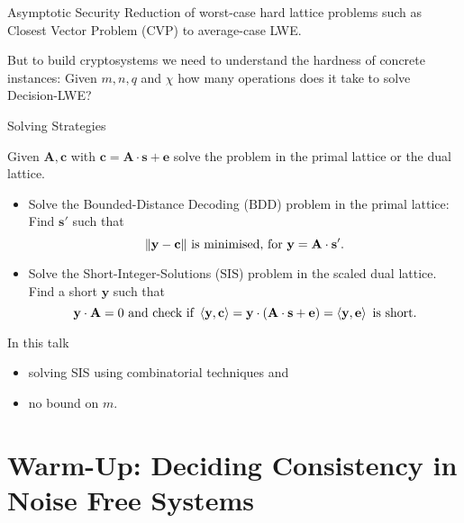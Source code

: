 \documentclass[10pt]{beamer}
\newcommand{\dotp}[2]{\ensuremath{\left\langle {#1},{#2}\right\rangle}\xspace}
\renewcommand{\vec}[1]{\mathbf{#1}\xspace}
\begin{document}
\begin{frame}{Asymptotic Security}
Reduction of worst-case hard lattice problems such as Closest Vector Problem (CVP) to average-case LWE.

\vspace{1em}\pause
 
But to build cryptosystems we need to understand the hardness of concrete instances: Given $m, n, q$ and $\chi$ how many operations does it take to solve Decision-LWE?

\end{frame}


\begin{frame}{Solving Strategies}

Given $\vec{A},\vec{c}$ with $\vec{c} = \vec{A} \cdot \vec{s} + \vec{e}$ solve the problem in the primal lattice or the dual lattice.

\vspace{1em}

\begin{itemize}

\item Solve the Bounded-Distance Decoding ($\mathrm{BDD}$) problem in the primal lattice: Find $\vec{s'}$ such that
\[
 \|\vec{y} - \vec{c}\| \textnormal{ is minimised, for } \vec{y} = \vec{A} \cdot \vec{s'}.
\]

\pause

\item Solve the Short-Integer-Solutions ($\mathrm{SIS}$) problem in the scaled dual lattice. Find a short $\vec{y}$ such that
\[
 \vec{y} \cdot \vec{A} = 0 \textnormal{ and check if } \dotp{\vec{y}}{\vec{c}} = \vec{y}\cdot \left(\vec{A} \cdot \vec{s} + \vec{e}\right) = \dotp{\vec{y}}{\vec{e}} \textnormal{ is short.}
\]
\end{itemize}

\pause

\begin{block}{In this talk}
\begin{itemize}
 \item solving SIS using combinatorial techniques and
 \item no bound on $m$.
\end{itemize}
\end{block}


\end{frame}


\section{Warm-Up: Deciding Consistency in Noise Free Systems}
\end{document}
